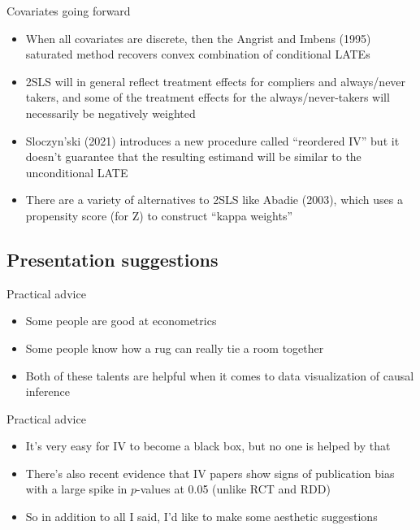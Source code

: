 \documentclass{beamer}
\begin{document}
\begin{frame}{Covariates going forward}

  \begin{itemize}
    \item When all covariates are discrete, then the Angrist and Imbens (1995) saturated method recovers convex combination of conditional LATEs
    \item 2SLS will in general reflect treatment effects for compliers and always/never takers, and some of the treatment effects for the always/never-takers will necessarily be negatively weighted
    \item Sloczyn'ski (2021) introduces a new procedure called ``reordered IV'' but it doesn't guarantee that the resulting estimand will be similar to the unconditional LATE
    \item There are a variety of alternatives to 2SLS like Abadie (2003), which uses a propensity score (for Z) to construct ``kappa weights''
  \end{itemize}

\end{frame}





\subsection{Presentation suggestions}


\begin{frame}{Practical advice}

  \begin{itemize}
    \item Some people are good at econometrics
    \item Some people know how a rug can really tie a room together
    \item Both of these talents are helpful when it comes to data visualization of causal inference
  \end{itemize}

\end{frame}

\begin{frame}{Practical advice}

  \begin{itemize}
    \item It's very easy for IV to become a black box, but no one is helped by that
    \item There's also recent evidence that IV papers show signs of publication bias with a large spike in $p$-values at 0.05 (unlike RCT and RDD)
    \item So in addition to all I said, I'd like to make some aesthetic suggestions

  \end{itemize}

\end{frame}
\end{document}

